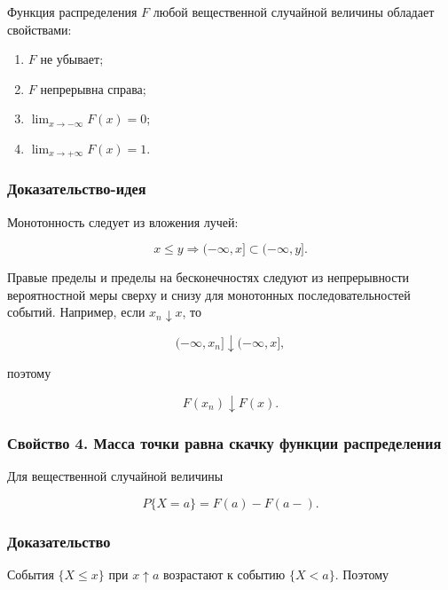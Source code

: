 \documentclass[
  11pt,
  a4paper,
]{article}
\providecommand{\tightlist}{%
  \setlength{\itemsep}{0pt}\setlength{\parskip}{0pt}}
\begin{document}
Функция распределения \(F\) любой вещественной случайной величины
обладает свойствами:

\begin{enumerate}
\def\labelenumi{\arabic{enumi}.}
\tightlist
\item
  \(F\) не убывает;
\item
  \(F\) непрерывна справа;
\item
  \(\lim_{x\to-\infty}F(x)=0\);
\item
  \(\lim_{x\to+\infty}F(x)=1\).
\end{enumerate}

\subsubsection{Доказательство-идея}\label{ux434ux43eux43aux430ux437ux430ux442ux435ux43bux44cux441ux442ux432ux43e-ux438ux434ux435ux44f}

Монотонность следует из вложения лучей:

\[
x\le y\Rightarrow (-\infty,x]\subset(-\infty,y].
\]

Правые пределы и пределы на бесконечностях следуют из непрерывности
вероятностной меры сверху и снизу для монотонных последовательностей
событий. Например, если \(x_n\downarrow x\), то

\[
(-\infty,x_n]\downarrow(-\infty,x],
\]

поэтому

\[
F(x_n)\downarrow F(x).
\]

\subsubsection{Свойство 4. Масса точки равна скачку функции
распределения}\label{ux441ux432ux43eux439ux441ux442ux432ux43e-4.-ux43cux430ux441ux441ux430-ux442ux43eux447ux43aux438-ux440ux430ux432ux43dux430-ux441ux43aux430ux447ux43aux443-ux444ux443ux43dux43aux446ux438ux438-ux440ux430ux441ux43fux440ux435ux434ux435ux43bux435ux43dux438ux44f}

Для вещественной случайной величины

\[
P\{X=a\}=F(a)-F(a-).
\]

\subsubsection{Доказательство}\label{ux434ux43eux43aux430ux437ux430ux442ux435ux43bux44cux441ux442ux432ux43e-1}

События \(\{X\le x\}\) при \(x\uparrow a\) возрастают к событию
\(\{X<a\}\). Поэтому
\end{document}
